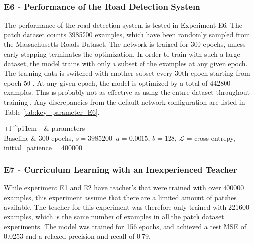 \subsubsection{E6 - Performance of the Road Detection System}
The performance of the road detection system is tested in Experiment E6. The patch dataset counts 3985200 examples, which have been randomly sampled from the Massachusetts Roads Dataset. The network is trained for 300 epochs, unless early stopping terminates the optimization. In order to train with such a large dataset, the model trains with only a subset of the examples at any given epoch. The training data is switched with another subset every 30th epoch starting from epoch 50 . At any given epoch, the model is optimized by a total of 442800 examples. This is probably not as effective as using the entire dataset throughout training . Any discrepancies from the default network configuration are listed in Table \ref{tab:key_parameter_E6}.
\begin{table}[h]
\caption{Key parameters for E6.}
\begin{center}
\begin{adjustbox}{max width=\textwidth}
\begin{tabular}{+l ^p{11cm}}\hline
\rowstyle{\bfseries}
  - & parameters \\\hline
  Baseline & 300 epochs, $s=3 985 200$, $a=0.0015$, $b=128$, $\mathcal{L}$ = cross-entropy, initial\_patience = 400000  \\
  \hline
\end{tabular}
\end{adjustbox}
\end{center}
\label{tab:key_parameter_E6}
\end{table}

\subsubsection{E7 - Curriculum Learning with an Inexperienced Teacher}
While experiment E1 and E2 have teacher's that were trained with over 400000 examples, this  
experiment assume that there are a limited amount of patches available. The teacher for this experiment was therefore only trained with 221600 examples, which is the same number of examples in all the patch dataset experiments. The model was trained for 156 epochs, and achieved a test \ac{MSE} of 0.0253 and a relaxed precision and recall of 0.79.\\

